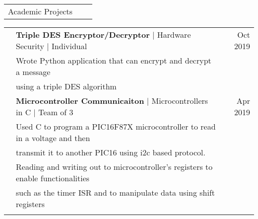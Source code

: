 \documentclass[letterpaper,10pt,oneside]{article}
\begin{document}
 \noindent \begin{tabularx}{\linewidth}{@{} l l R } 
     \Large{Academic Projects}\\
 \end{tabularx}
 \noindent \begin{tabularx}{\linewidth}{@{} l l R } 
     & \textbf{Triple DES Encryptor/Decryptor} $\mid$ Hardware Security $\mid$ Individual & Oct 2019 \\
     & \indent Wrote Python application that can encrypt and decrypt a message\\
     & \indent \space \space using a triple DES algorithm\\
     & \textbf{Microcontroller Communicaiton} $\mid$ Microcontrollers in C $\mid$ Team of 3 & Apr 2019 \\
     & \indent Used C to program a PIC16F87X microcontroller to read in a voltage and then \\
     & \indent \space \space transmit it to another PIC16 using i2c based protocol.\\
     & \indent Reading and writing out to microcontroller's registers to enable functionalities \\
     & \indent \space \space such as the timer ISR and to manipulate data using shift registers\\
     \\
\end{tabularx}
\end{document}
